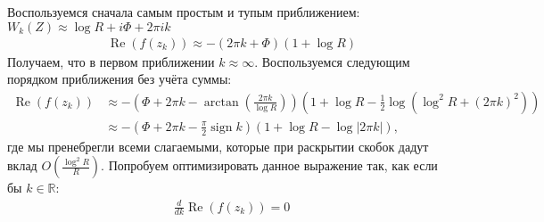 \documentclass[a4paper, 12pt]{article}
\DeclareMathOperator*{\sign}{sign}
\DeclareMathOperator*{\Real}{Re}
\begin{document}
Воспользуемся сначала самым простым и тупым приближением: $W_k(Z) \approx \log R + i\Phi + 2\pi i k$
\begin{equation}
\begin{aligned}
    \Real\left(f(z_k)\right) \approx -(2\pi k+\Phi)(1+\log R)
\end{aligned}
\end{equation}
Получаем, что в первом приближении $k\approx \infty$.
Воспользуемся следующим порядком приближения без учёта суммы:
\begin{equation}
\begin{aligned}
    \Real\left(f(z_k)\right) &\approx
    -\left(\Phi + 2\pi k - \arctan\left(\frac{2\pi k}{\log R}\right)\right)\left(1+\log R - \frac{1}{2}\log\left(\log^2 R + (2\pi k)^2\right)\right)\\
    &\approx -\left(\Phi + 2\pi k - \frac{\pi}{2}\sign k\right)\left(1+\log R - \log|2\pi k|\right),
\end{aligned}
\end{equation}
где мы пренебрегли всеми слагаемыми, которые при раскрытии скобок дадут вклад $O\left(\frac{\log^2 R}{R}\right)$. Попробуем оптимизировать данное выражение так, как если бы $k\in\mathbb{R}$:
\begin{equation}
\begin{aligned}
    \frac{d}{dk}\Real\left(f(z_k)\right) = 0\\
\end{aligned}
\end{equation}
\end{document}
